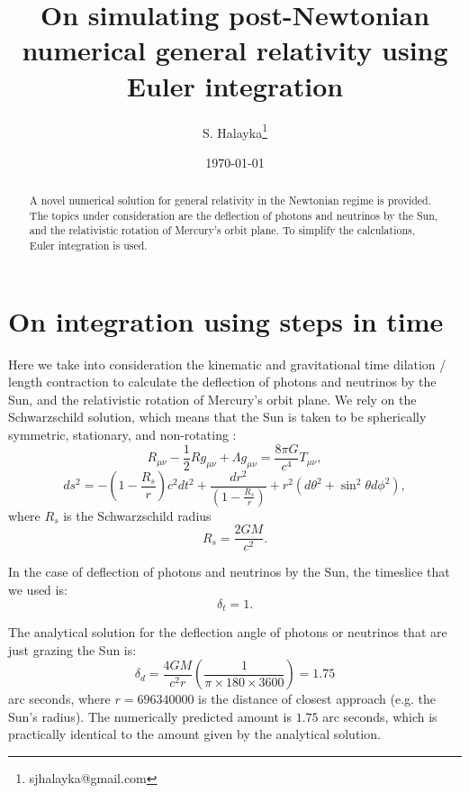 \documentclass[12pt]{article}
\title{On simulating post-Newtonian numerical general relativity using Euler integration}
\author{S. Halayka\footnote{sjhalayka@gmail.com}}
\date{\today\;\currenttime}
\begin{document}
 
\maketitle

\begin{abstract}
A novel numerical solution for general relativity in the Newtonian regime is provided.
The topics under consideration are the deflection of photons and neutrinos by the Sun, and the relativistic rotation of Mercury's orbit plane.
To simplify the calculations, Euler integration is used.
\end{abstract}





\section{On integration using steps in time}

Here we take into consideration the kinematic and gravitational time dilation / length contraction to calculate the deflection of photons and neutrinos by the Sun, and the relativistic rotation of Mercury's orbit plane.
We rely on the Schwarzschild solution, which means that the Sun is taken to be spherically symmetric, stationary, and non-rotating \cite{misner}:
\begin{equation}
R_{\mu\nu} - \frac{1}{2} R g_{\mu\nu} + \Lambda g_{\mu\nu} = \frac{8\pi G}{c^4} T_{\mu\nu},
\end{equation}
\begin{equation}
ds^2 = -\left( 1 - \frac{R_{s}}{r} \right) c^2 dt^2 + \frac{dr^2}{\left( 1 - \frac{R_{s}}{r} \right)} + r^2 (d\theta^2 + \sin^2 \theta d\phi^2),
\end{equation}
where $R_{s}$ is the Schwarzschild radius
\begin{equation}
R_{s} = \frac{2GM}{c^2}.
\end{equation}

In the case of deflection of photons and neutrinos by the Sun, the timeslice that we used is:
\begin{equation}
\delta_{t} = 1.
\end{equation}



The analytical solution for the deflection angle of photons or neutrinos that are just grazing the Sun is:
\begin{equation}
\delta_{d} = \frac{4GM}{c^2 r} \left( \frac{1}{\pi \times 180 \times 3600} \right) = 1.75
\end{equation}
arc seconds, where $r = 696340000$ is the distance of closest approach (e.g. the Sun's radius).
The numerically predicted amount is $1.75$ arc seconds, which is practically identical to the amount given by the analytical solution.
\end{document}
